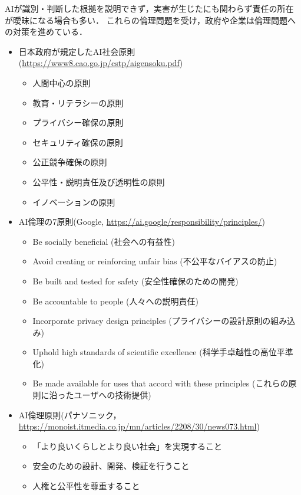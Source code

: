 AIが識別・判断した根拠を説明できず，実害が生じたにも関わらず責任の所在が曖昧になる場合も多い．
これらの倫理問題を受け，政府や企業は倫理問題への対策を進めている．

\begin{itemize}
	\item 日本政府が規定したAI社会原則 (\url{https://www8.cao.go.jp/cstp/aigensoku.pdf})
	\begin{itemize}
		\item 人間中心の原則
		\item 教育・リテラシーの原則
		\item プライバシー確保の原則
		\item セキュリティ確保の原則
		\item 公正競争確保の原則
		\item 公平性・説明責任及び透明性の原則
		\item イノベーションの原則
	\end{itemize}
	\item AI倫理の7原則(Google, \url{https://ai.google/responsibility/principles/})
	\begin{itemize}
		\item Be socially beneficial (社会への有益性)
		\item Avoid creating or reinforcing unfair bias (不公平なバイアスの防止)
		\item Be built and tested for safety (安全性確保のための開発)
		\item Be accountable to people (人々への説明責任)
		\item Incorporate privacy design principles (プライバシーの設計原則の組み込み)
		\item Uphold high standards of scientific excellence (科学手卓越性の高位平準化)
		\item Be made available for uses that accord with these principles (これらの原則に沿ったユーザへの技術提供)
	\end{itemize}
	\item AI倫理原則(パナソニック，\url{https://monoist.itmedia.co.jp/mn/articles/2208/30/news073.html})
	\begin{itemize}
		\item 「より良いくらしとより良い社会」を実現すること
		\item 安全のための設計、開発、検証を行うこと
		\item 人権と公平性を尊重すること

\end{itemize}
\end{itemize}
